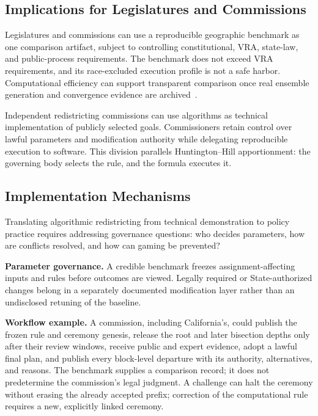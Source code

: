 \subsection{Implications for Legislatures and Commissions}

Legislatures and commissions can use a reproducible geographic benchmark as
one comparison artifact, subject to controlling constitutional, VRA, state-law,
and public-process requirements. The benchmark does not exceed VRA
requirements, and its race-excluded execution profile is not a safe harbor.
Computational efficiency can support transparent comparison once real ensemble
generation and convergence evidence are archived~\cite{deluca2026recursive}.

Independent redistricting commissions can use algorithms as technical
implementation of publicly selected goals. Commissioners retain control over
lawful parameters and modification authority while delegating reproducible
execution to software. This division parallels Huntington--Hill apportionment:
the governing body selects the rule, and the formula executes it.

\subsection{Implementation Mechanisms}

Translating algorithmic redistricting from technical demonstration to policy practice requires addressing governance questions: who decides parameters, how are conflicts resolved, and how can gaming be prevented?

\textbf{Parameter governance.} A credible benchmark freezes
assignment-affecting inputs and rules before outcomes are viewed. Legally
required or State-authorized changes belong in a separately documented
modification layer rather than an undisclosed retuning of the baseline.

\textbf{Workflow example.} A commission, including California's, could publish
the frozen rule and ceremony genesis, release the root and later bisection
depths only after their review windows, receive public and expert evidence, adopt a
lawful final plan, and publish every block-level departure with its authority,
alternatives, and reasons. The benchmark supplies a comparison record; it does
not predetermine the commission's legal judgment. A challenge can halt the
ceremony without erasing the already accepted prefix; correction of the
computational rule requires a new, explicitly linked ceremony.

